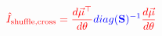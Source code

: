 \documentclass[10pt]{article}
\begin{document}
\begin{align*}\color{red}{\hat{I}_\textrm{shuffle,cross} = \frac{d \vec{\mu}^{\top}}{d \theta} \color{blue}diag(\mathbf{S})^{-1} \color{red}\frac{d \vec{\mu}}{d \theta}}\end{align*}
\end{document}

